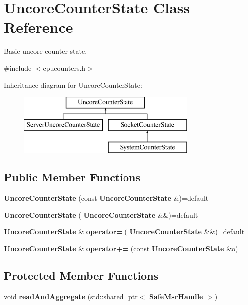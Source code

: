 \section{Uncore\+Counter\+State Class Reference}
\label{classUncoreCounterState}


Basic uncore counter state.  




{\ttfamily \#include $<$cpucounters.\+h$>$}

Inheritance diagram for Uncore\+Counter\+State\+:\begin{figure}[H]
\begin{center}
\leavevmode
\includegraphics[height=3.000000cm]{classUncoreCounterState}
\end{center}
\end{figure}
\subsection*{Public Member Functions}
\begin{DoxyCompactItemize}
\item 
\mbox{\label{classUncoreCounterState_a5c33a83589b86c9ce12bd000fdaf8d74}} 
{\bfseries Uncore\+Counter\+State} (const \textbf{ Uncore\+Counter\+State} \&)=default
\item 
\mbox{\label{classUncoreCounterState_a1fbc6d02caadce898e6e41308caeb8d3}} 
{\bfseries Uncore\+Counter\+State} (\textbf{ Uncore\+Counter\+State} \&\&)=default
\item 
\mbox{\label{classUncoreCounterState_a4a1452f45ed8ea84f1607b8c9b485229}} 
\textbf{ Uncore\+Counter\+State} \& {\bfseries operator=} (\textbf{ Uncore\+Counter\+State} \&\&)=default
\item 
\mbox{\label{classUncoreCounterState_a96eb270d92f202a85ed11ded8cf60f71}} 
\textbf{ Uncore\+Counter\+State} \& {\bfseries operator+=} (const \textbf{ Uncore\+Counter\+State} \&o)
\end{DoxyCompactItemize}
\subsection*{Protected Member Functions}
\begin{DoxyCompactItemize}
\item 
\mbox{\label{classUncoreCounterState_a2583a9807bb67e008e6ffde1cd13850f}} 
void {\bfseries read\+And\+Aggregate} (std\+::shared\+\_\+ptr$<$ \textbf{ Safe\+Msr\+Handle} $>$)
\end{DoxyCompactItemize}
